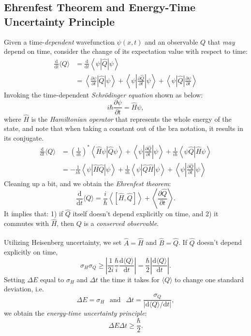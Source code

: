 	\subsection{Ehrenfest Theorem and Energy-Time Uncertainty Principle}
	Given a time-\emph{dependent} wavefunction $\psi(x, t)$ and an observable $Q$ that \emph{may} depend on time, 
	consider the change of its expectation value with respect to time:
	\[\begin{aligned}
		\frac{\text{d}}{\text{d}t}\langle Q \rangle
		& = \frac{\text{d}}{\text{d}t} \left\langle \psi \left| \hat{Q} \right| \psi \right\rangle \\
		& = \left\langle \frac{\partial\psi}{\partial t} \left| \hat{Q} \right| \psi \right\rangle +
			\left\langle \psi \left| \frac{\partial\hat{Q}}{\partial t} \right| \psi \right\rangle +
			\left\langle \psi \left| \hat{Q} \right| \frac{\partial\psi}{\partial t} \right\rangle
	\end{aligned}\]
	Invoking the time-dependent \emph{Schr\"odinger equation} shown as below:
	\[i\hbar\frac{\partial\psi}{\partial t} = \hat{H}\psi,\]
	where $\hat{H}$ is the \emph{Hamiltonian operator} that represents the whole energy of the state, 
	and note that when taking a constant out of the bra notation, it results in its conjugate.
	\[\begin{aligned}
		\frac{\text{d}}{\text{d}t}\langle Q \rangle
		& = \left(\frac{1}{i\hbar}\right)^*\left\langle \hat{H}\psi \left| \hat{Q} \right. \psi \right\rangle + 
		\left\langle \psi \left| \frac{\partial\hat{Q}}{\partial t} \right| \psi \right\rangle + 
		\frac{1}{i\hbar}\left\langle \psi \left. \hat{Q} \right| \hat{H}\psi \right\rangle\\
		& = -\frac{1}{i\hbar}\left\langle \psi \left| \hat{H}\hat{Q} \right| \psi \right\rangle + 
		\frac{1}{i\hbar}\left\langle \psi \left| \hat{Q}\hat{H} \right| \psi \right\rangle + 
		\left\langle \psi \left| \frac{\partial\hat{Q}}{\partial t} \right| \psi \right\rangle
	\end{aligned}\]
	Cleaning up a bit, and we obtain the \emph{Ehrenfest theorem}:
	\[\frac{\text{d}}{\text{d}t}\langle Q \rangle = \frac{i}{\hbar}\left\langle\left[\hat{H}, \hat{Q}\right]\right\rangle + \left\langle\frac{\partial\hat{Q}}{\partial t}\right\rangle.\]
	It implies that: 1) if $\hat{Q}$ itself doesn't depend explicitly on time, and 2) it commutes with $\hat{H}$, then $Q$ is a \emph{conserved observable}.\\ \\
	Utilizing Heisenberg uncertainty, we set $\hat{A} = \hat{H}$ and $\hat{B} = \hat{Q}$. If $\hat{Q}$ doesn't depend explicitly on time, 
	\[\sigma_{H}\sigma_{Q} \geq \left| \frac{1}{2i}\frac{\hbar}{i}\frac{\text{d}\langle Q \rangle}{\text{d}t} \right| 
	= \frac{\hbar}{2}\left|\frac{\text{d}\langle Q \rangle}{\text{d}t} \right|. \]
	Setting $\Delta E$ equal to $\sigma_{H}$ and $\Delta t$ the time it takes for $\langle Q \rangle$ to change one standard deviation, i.e.
	\[\Delta E = \sigma_{H}\ \ \text{    and    }\ \ \Delta t = \frac{\sigma_{Q}}{\left|\text{d}\langle Q \rangle/\text{d}t\right|},\]
	we obtain the \emph{energy-time uncertainty principle}:
	\[\Delta E \Delta t \geq \frac{\hbar}{2}.\]
	
